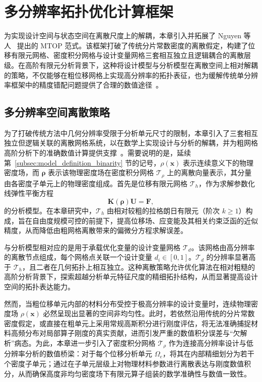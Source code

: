 \section{多分辨率拓扑优化计算框架}
\label{sec:mtop_framework}

为实现设计空间与状态空间在离散尺度上的解耦，本章引入并拓展了 Nguyen 等人~\cite{nguyenComputationalParadigmMultiresolution2010a} 提出的 MTOP 范式。该框架打破了传统分片常数密度的离散假定，构建了位移有限元网格、密度积分网格与设计变量网格三套相互独立且逻辑耦合的离散层级。在高阶有限元分析背景下，这种将设计模型与分析模型在离散空间上相对解耦的策略，不仅能够在粗位移网格上实现高分辨率的拓扑表征，也为缓解传统单分辨率框架中的精度错配问题提供了合理的数值途径~\cite{nguyenTopologyOptimizationUsing2017a}。



\subsection{多分辨率空间离散策略}
\label{subsec:multires_spatial_discretization}

为了打破传统方法中几何分辨率受限于分析单元尺寸的限制，本章引入了三套相互独立但逻辑关联的离散网格系统，以在数学上实现设计与分析的解耦，并为粗网格高阶分析下的准确数值计算提供支撑~\cite{nguyenComputationalParadigmMultiresolution2010a}。需要说明的是，延续第~\ref{subsec:model_definition_binarity} 节的记号，$\rho(\boldsymbol{x})$ 表示连续意义下的物理密度场，而 $\boldsymbol{\rho}$ 表示该物理密度场在密度积分网格 $\mathcal{T}_\rho$ 上的离散向量表示，其分量由各密度子单元上的物理密度组成。首先是位移有限元网格 $\mathcal{T}_h$，作为求解参数化线弹性平衡方程
\[
\boldsymbol{K}(\boldsymbol{\rho})\boldsymbol{U} = \boldsymbol{F},
\]
的分析模型。在本章研究中，$\mathcal{T}_h$ 由相对较粗的拉格朗日有限元（阶次 $k\geq1$）构成，旨在自由度规模可控的前提下，提高位移场、应变能及其相关约束泛函的近似精度，从而降低由粗网格离散带来的偏微分方程求解误差。

与分析模型相对应的是用于承载优化变量的设计变量网格 $\mathcal{T}_d$。该网格由高分辨率的离散节点组成，每个网格点关联一个设计变量 $d_i \in [0, 1]$。$\mathcal{T}_d$ 的分辨率显著高于 $\mathcal{T}_h$，且二者在几何拓扑上相互独立。这种离散策略允许优化算法在相对粗糙的高阶分析背景下，探索超越分析单元特征尺度的精细拓扑结构，从而显著提高设计空间的拓扑表达能力。

然而，当粗位移单元内部的材料分布受控于极高分辨率的设计变量时，连续物理密度场 $\rho(\boldsymbol{x})$
必然呈现出显著的空间非均匀性。此时，若依然沿用传统的分片常数密度假定，或直接在粗单元上采用常规高斯积分进行刚度评估，将无法准确捕捉材料高频分布对局部算子刚度的真实贡献，进而引发严重的数值积分误差与“欠解析”病态。为此，本章进一步引入了密度积分网格 $\mathcal{T}_\rho$ 作为连接高分辨率设计与低分辨率分析的数值桥梁：对于每个位移分析单元 $\Omega_e$，将其在内部精细划分为若干个密度子单元；通过在子单元层级上对物理材料参数进行离散表达与刚度数值积分，从而确保高度非均匀密度场下有限元算子组装的数学准确性与数值一致性。

